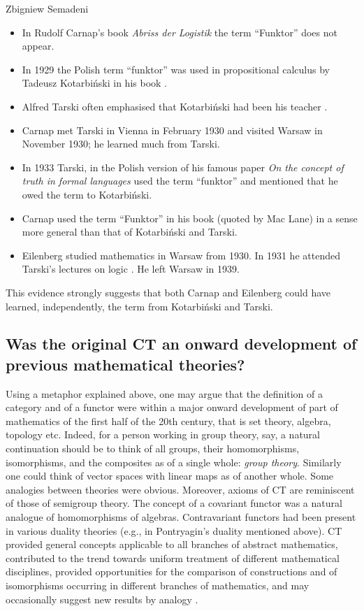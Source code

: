 \begin{artengenv}{Zbigniew Semadeni}
\begin{itemize}
\item In Rudolf Carnap's book \textit{Abriss der Logistik} \parencite{Abriss} the term ``Funktor'' does not appear. 
\item In 1929 the Polish term ``funktor'' was used in propositional calculus by 
Tadeusz Kotarbi\'nski in his book \parencite{Kotarbinski}.
\item Alfred Tarski often emphasised that Kotarbi\'nski had been his teacher 
\parencite[part~2]{Feferman}. 
\item Carnap met Tarski in Vienna in February 1930 and visited Warsaw in November 
1930; he learned much from Tarski. 
\item In 1933 Tarski, in the Polish version of his famous paper \textit{On the 
concept of truth in formal languages} \citeauthor{Tarski} \parencite*{Tarski} used the term ``funktor'' 
and mentioned that he owed the term to Kotarbiński.  
\item Carnap used the term ``Funktor''  in his book \parencite*{Logische} (quoted 
by Mac Lane) in a sense more general than that of Kotarbi\'nski and Tarski. 
\item Eilenberg studied mathematics in Warsaw from 1930. In 1931 he attended 
Tarski's lectures on logic \parencite[part~3 and~12]{Feferman}. He left Warsaw in 1939. 
\end{itemize}

This evidence strongly suggests that both Carnap and Eilenberg could have learned, 
independently, the term from Kotarbi{\'n}ski and Tarski.

\subsection{Was the original CT an onward development of previous mathematical theories?}
Using a metaphor explained above, one may argue that the definition of a 
category and of a functor were within a major onward development of part of 
mathematics of the first half of the 20th century, that is set theory, 
algebra, topology etc. Indeed, for a person working in group theory, say, 
a natural continuation should be to think of all groups, their homomorphisms, 
isomorphisms, and the composites as of a single whole: \textit{group theory}. 
Similarly one could think of vector spaces with linear maps as of another whole. 
Some analogies between theories were obvious. Moreover, axioms of CT are 
reminiscent of those of semigroup theory. The concept of a covariant functor 
was a natural analogue of homomorphisms of algebras. Contravariant functors 
had been present in various duality theories (e.g., in Pontryagin’s duality 
mentioned above). CT provided general concepts applicable to all branches of abstract 
mathematics, contributed to the trend towards uniform treatment of different 
mathematical disciplines, provided opportunities for the comparison of 
constructions and of isomorphisms occurring in different branches of mathematics, 
and may occasionally  suggest new results by analogy \parencite[p.236]{E-ML}. 


\end{artengenv}
